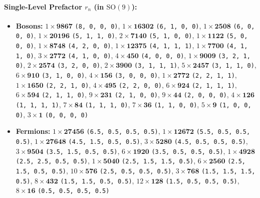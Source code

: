 \documentclass[11pt,a4paper]{article}
\begin{document}
\paragraph{Single-Level Prefactor $r_n$ (in $\mathrm{SO}(9)$):}
\begin{itemize}
    \item \textbf{Bosons:} $1 \times \mathbf{9867}$ \texttt{(8, 0, 0, 0)}, $1 \times \mathbf{16302}$ \texttt{(6, 1, 0, 0)}, $1 \times \mathbf{2508}$ \texttt{(6, 0, 0, 0)}, $1 \times \mathbf{20196}$ \texttt{(5, 1, 1, 0)}, $2 \times \mathbf{7140}$ \texttt{(5, 1, 0, 0)}, $1 \times \mathbf{1122}$ \texttt{(5, 0, 0, 0)}, $1 \times \mathbf{8748}$ \texttt{(4, 2, 0, 0)}, $1 \times \mathbf{12375}$ \texttt{(4, 1, 1, 1)}, $1 \times \mathbf{7700}$ \texttt{(4, 1, 1, 0)}, $3 \times \mathbf{2772}$ \texttt{(4, 1, 0, 0)}, $4 \times \mathbf{450}$ \texttt{(4, 0, 0, 0)}, $1 \times \mathbf{9009}$ \texttt{(3, 2, 1, 0)}, $2 \times \mathbf{2574}$ \texttt{(3, 2, 0, 0)}, $2 \times \mathbf{3900}$ \texttt{(3, 1, 1, 1)}, $5 \times \mathbf{2457}$ \texttt{(3, 1, 1, 0)}, $6 \times \mathbf{910}$ \texttt{(3, 1, 0, 0)}, $4 \times \mathbf{156}$ \texttt{(3, 0, 0, 0)}, $1 \times \mathbf{2772}$ \texttt{(2, 2, 1, 1)}, $1 \times \mathbf{1650}$ \texttt{(2, 2, 1, 0)}, $4 \times \mathbf{495}$ \texttt{(2, 2, 0, 0)}, $6 \times \mathbf{924}$ \texttt{(2, 1, 1, 1)}, $6 \times \mathbf{594}$ \texttt{(2, 1, 1, 0)}, $9 \times \mathbf{231}$ \texttt{(2, 1, 0, 0)}, $9 \times \mathbf{44}$ \texttt{(2, 0, 0, 0)}, $4 \times \mathbf{126}$ \texttt{(1, 1, 1, 1)}, $7 \times \mathbf{84}$ \texttt{(1, 1, 1, 0)}, $7 \times \mathbf{36}$ \texttt{(1, 1, 0, 0)}, $5 \times \mathbf{9}$ \texttt{(1, 0, 0, 0)}, $3 \times \mathbf{1}$ \texttt{(0, 0, 0, 0)}
    \item \textbf{Fermions:} $1 \times \mathbf{27456}$ \texttt{(6.5, 0.5, 0.5, 0.5)}, $1 \times \mathbf{12672}$ \texttt{(5.5, 0.5, 0.5, 0.5)}, $1 \times \mathbf{27648}$ \texttt{(4.5, 1.5, 0.5, 0.5)}, $3 \times \mathbf{5280}$ \texttt{(4.5, 0.5, 0.5, 0.5)}, $3 \times \mathbf{9504}$ \texttt{(3.5, 1.5, 0.5, 0.5)}, $6 \times \mathbf{1920}$ \texttt{(3.5, 0.5, 0.5, 0.5)}, $1 \times \mathbf{4928}$ \texttt{(2.5, 2.5, 0.5, 0.5)}, $1 \times \mathbf{5040}$ \texttt{(2.5, 1.5, 1.5, 0.5)}, $6 \times \mathbf{2560}$ \texttt{(2.5, 1.5, 0.5, 0.5)}, $10 \times \mathbf{576}$ \texttt{(2.5, 0.5, 0.5, 0.5)}, $3 \times \mathbf{768}$ \texttt{(1.5, 1.5, 1.5, 0.5)}, $8 \times \mathbf{432}$ \texttt{(1.5, 1.5, 0.5, 0.5)}, $12 \times \mathbf{128}$ \texttt{(1.5, 0.5, 0.5, 0.5)}, $8 \times \mathbf{16}$ \texttt{(0.5, 0.5, 0.5, 0.5)}
\end{itemize}
\end{document}
